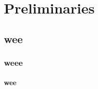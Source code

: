 \documentclass[main.tex]{subfiles}
\begin{document}
\chapter{Preliminaries}

\section{wee}

\subsection{weee}

\subsubsection{wee}

\stub
\end{document}
